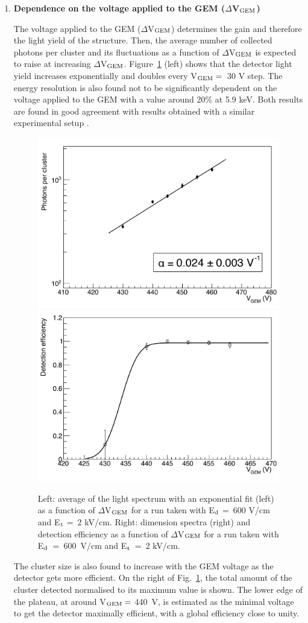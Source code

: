 \documentclass[a4paper]{jpconf}
\begin{document}
\begin{enumerate}
\item \textbf{Dependence on the voltage applied to the GEM ($\Delta$V$_{\rm GEM}$)}

The voltage applied to the GEM ($\Delta$V$_{\rm GEM}$) determines the
gain and therefore the light yield of the structure. Then, the average
number of collected photons per cluster and its fluctuations as a
function of $\Delta$V$_{\rm GEM}$ is expected to raise at increasing
$\Delta$V$_{\rm GEM}$.  Figure~\ref{fig:vgem1} (left) shows that the
detector light yield increases exponentially and doubles every V$_{\rm
  GEM} =$~30 V step.  The energy resolution is also found not to be
significantly dependent on the voltage applied to the GEM with a value
around 20\% at 5.9 keV. Both results are found in good agreement with
results obtained with a similar experimental setup \cite{bib:loomba}.


\begin{figure}[htbp]
\centering
\includegraphics[width=.42\textwidth]{gPhotFar_Vg.pdf}
\includegraphics[width=.42\textwidth]{gEffFar_Vg.pdf}
\caption{Left: average of the light spectrum with an exponential fit
  (left) as a function of $\Delta$V$_{\rm GEM}$ for a run taken with
  E$_{\rm d}$ =~600 V/cm and E$_{\rm t}$ =~2 kV/cm. Right: dimension
  spectra (right) and detection efficiency as a function of
  $\Delta$V$_{\rm GEM}$ for a run taken with E$_{\rm d}$~=~600~V/cm
  and E$_{\rm t}$~=~2 kV/cm. \label{fig:vgem1}}
\end{figure}

The cluster size is also found to increase with the GEM voltage as the
detector gets more efficient.  On the right of Fig.~\ref{fig:vgem1},
the total amount of the cluster detected normalised to its maximum
value is shown.  The lower edge of the plateau, at around V$_{\rm
  GEM}=$ 440~V, is estimated as the minimal voltage to get the
detector maximally efficient, with a global efficiency close to unity.


\end{enumerate}
\end{document}
